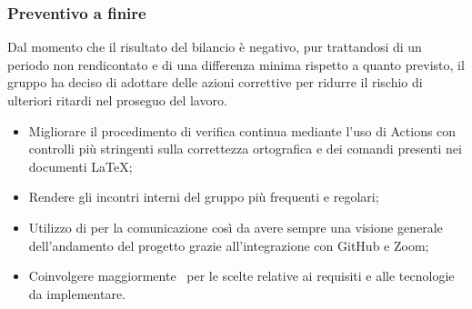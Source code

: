 \subsubsection{Preventivo a finire}
Dal momento che il risultato del bilancio è negativo, pur trattandosi di un periodo non rendicontato e di una differenza minima rispetto a quanto previsto, il gruppo {\Gruppo} ha deciso di adottare delle azioni correttive per ridurre il rischio di ulteriori ritardi nel proseguo del lavoro.
\begin{itemize}
	\item Migliorare il procedimento di verifica continua mediante l'uso di  Actions con controlli più stringenti sulla correttezza ortografica e dei comandi presenti nei documenti \LaTeX{};
	\item Rendere gli incontri interni del gruppo più frequenti e regolari;
	\item Utilizzo di  per la comunicazione così da avere sempre una visione generale dell'andamento del progetto grazie all'integrazione con GitHub e Zoom;
	\item Coinvolgere maggiormente \Proponente\ per le scelte relative ai requisiti e alle tecnologie da implementare.
\end{itemize}